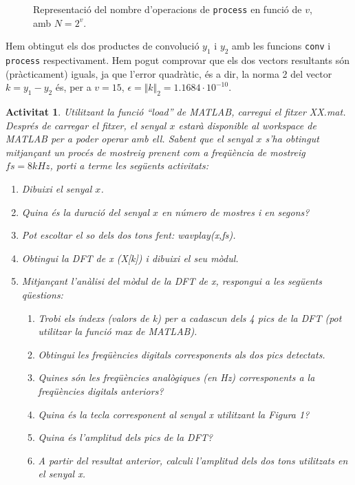 \documentclass[11pt,a4]{article}
\numberwithin{equation}{section}
\theoremstyle{thmstyle}
\theoremstyle{thmstyle}
\theoremstyle{thmstyle}
\theoremstyle{thmstyle}
\theoremstyle{thmstyle}
\theoremstyle{thmstyle}
\theoremstyle{thmstyle}
\newtheorem{activity}{Activitat}
\begin{document}
\begin{figure}[h]
\centering
{}
\caption{Representació del nombre d'operacions de {\tt process} en funció de $v$, amb $N = 2^v$.}
\label{fig:teoric}
\end{figure}

Hem obtingut els dos productes de convolució $y_1$ i $y_2$ amb les funcions {\tt conv} i {\tt process} respectivament. Hem pogut comprovar que els dos vectors resultants són (pràcticament) iguals, ja que l'error quadràtic, és a dir, la norma 2 del vector $k = y_1 - y_2$ és, per a $v=15$, $\epsilon = \Vert k \Vert_2 = 1.1684 \cdot 10^{-10}$.

\begin{activity}
Utilitzant la funció “load” de MATLAB, carregui el fitxer XX.mat. Després de carregar el fitxer, el senyal $x$ estarà disponible al workspace de MATLAB per a poder operar amb ell. Sabent que el senyal $x$ s’ha obtingut mitjançant un procés de mostreig prenent com a freqüència de mostreig $fs = 8 kHz$, porti a terme les següents activitats:
\begin{enumerate}[-]
\item Dibuixi el senyal $x$.
\item Quina és la duració del senyal $x$ en número de mostres i en segons?
\item Pot escoltar el so dels dos tons fent: wavplay(x,fs).
\item Obtingui la DFT de x (X[k]) i dibuixi el seu mòdul.
\item Mitjançant l’anàlisi del mòdul de la DFT de x, respongui a les següents qüestions:
\begin{enumerate}[$\circ$]
\item Trobi els índexs (valors de k) per a cadascun dels 4 pics de la DFT (pot utilitzar
la funció max de MATLAB).
\item Obtingui les freqüències digitals corresponents als dos pics detectats.
\item Quines són les freqüències analògiques (en Hz) corresponents a la freqüències
digitals anteriors?
\item Quina és la tecla corresponent al senyal x utilitzant la Figura 1?
\item Quina és l’amplitud dels pics de la DFT?
\item A partir del resultat anterior, calculi l’amplitud dels dos tons utilitzats en el
senyal x.
\end{enumerate}
\end{enumerate}
\end{activity}
\end{document}

